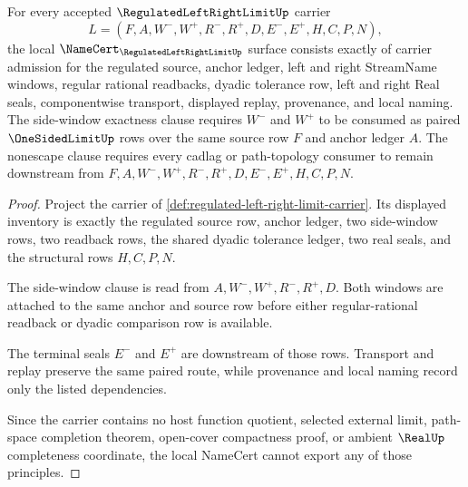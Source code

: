 \begin{theorem}
\label{thm:regulated-left-right-limit-namecert-obligations}
For every accepted $\RegulatedLeftRightLimitUp$ carrier
$$
L=(F,A,W^-,W^+,R^-,R^+,D,E^-,E^+,H,C,P,N),
$$
the local $\NameCert_{\RegulatedLeftRightLimitUp}$ surface consists exactly of carrier admission for the regulated source, anchor ledger, left and right StreamName windows, regular rational readbacks, dyadic tolerance row, left and right Real seals, componentwise transport, displayed replay, provenance, and local naming. The side-window exactness clause requires $W^-$ and $W^+$ to be consumed as paired $\OneSidedLimitUp$ rows over the same source row $F$ and anchor ledger $A$. The nonescape clause requires every cadlag or path-topology consumer to remain downstream from $F,A,W^-,W^+,R^-,R^+,D,E^-,E^+,H,C,P,N$.
\end{theorem}
\begin{proof}
Project the carrier of \autoref{def:regulated-left-right-limit-carrier}. Its displayed inventory is exactly the regulated source row, anchor ledger, two side-window rows, two readback rows, the shared dyadic tolerance ledger, two real seals, and the structural rows $H,C,P,N$.

The side-window clause is read from $A,W^-,W^+,R^-,R^+,D$. Both windows are attached to the same anchor and source row before either regular-rational readback or dyadic comparison row is available.

The terminal seals $E^-$ and $E^+$ are downstream of those rows. Transport and replay preserve the same paired route, while provenance and local naming record only the listed dependencies.

Since the carrier contains no host function quotient, selected external limit, path-space completion theorem, open-cover compactness proof, or ambient $\RealUp$ completeness coordinate, the local NameCert cannot export any of those principles.
\end{proof}

